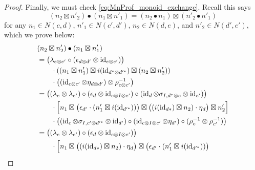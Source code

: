 \documentclass[11pt,oneside,article]{memoir}
\begin{document}
\begin{proof}
   Finally, we must check \eqref{eq:MnProf_monoid_exchange}. Recall this says
   \begin{equation*}
      (n_2\boxtimes n'_2)\bullet(n_1\boxtimes n'_1)=(n_2\bullet n_1)\boxtimes(n'_2\bullet n'_1)
   \end{equation*}
   for any $n_1\in N(c,d)$, $n'_1\in N(c',d')$, $n_2\in N(d,e)$, and $n'_2\in N(d',e')$, which we
   prove below:
   \begin{align*}
      &(n_2\boxtimes n'_2)\bullet(n_1\boxtimes n'_1) \\
      &= \bigl(\lambda_{e\otimes e'}\circ(\epsilon_{d\otimes d'}\otimes\id_{e\otimes e'})\bigr) \\
      &\qquad \cdot \left((n_1\boxtimes n'_1)\boxtimes i(\id_{d^*\otimes d'^{*}})
            \boxtimes(n_2\boxtimes n'_2)\right) \\
      &\qquad \cdot \left((\id_{c\otimes c'}\otimes\eta_{d\otimes d'})
         \otimes \rho_{c\otimes c'}^{-1}\right)\\
      &= \bigl((\lambda_e\otimes \lambda_{e'})\circ(\epsilon_d\otimes\id_{e\otimes I\otimes e'})
            \circ(\id_d\otimes\sigma_{I,d^*\otimes e}\otimes\id_{e'})\bigr) \\
      &\qquad \cdot \Bigl[n_1\boxtimes\bigl(\epsilon_{d'}\cdot(n'_1\boxtimes i(\id_{d'^{*}}))\bigr)
            \boxtimes \bigl((i(\id_{d*})\boxtimes n_2)\cdot\eta_d\bigr)\boxtimes n'_2\Bigr] \\
      &\qquad \cdot \bigl((\id_c\otimes\sigma_{I,c'\otimes d'^*}\otimes\id_{d'})
            \circ (\id_{c\otimes I\otimes c'}\otimes\eta_{d'})
            \circ (\rho_c^{-1}\otimes \rho_{c'}^{-1})\bigr) \\
      &= \bigl((\lambda_e\otimes \lambda_{e'})\circ(\epsilon_d\otimes\id_{e\otimes I\otimes e'})\bigr) \\
      &\qquad \cdot \Bigl[n_1\boxtimes\bigl((i(\id_{d*})\boxtimes n_2)\cdot\eta_d\bigr)
            \boxtimes \bigl(\epsilon_{d'}\cdot(n'_1\boxtimes i(\id_{d'^{*}}))\bigr)

\end{align*}
\end{proof}
\end{document}
